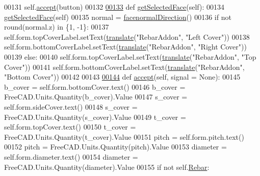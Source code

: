 \begin{DoxyCode}
00131             self.\hyperlink{classHelicalRebar_1_1__HelicalRebarTaskPanel_acdfb101876d4841ba277e2e884ebaf9d}{accept}(button)
00132 
\hypertarget{HelicalRebar_8py_source.tex_l00133}{}\hyperlink{classHelicalRebar_1_1__HelicalRebarTaskPanel_aea514ce88bde89c57ab88576e7a27230}{00133}     \textcolor{keyword}{def }\hyperlink{classHelicalRebar_1_1__HelicalRebarTaskPanel_aea514ce88bde89c57ab88576e7a27230}{getSelectedFace}(self):
00134         \hyperlink{classHelicalRebar_1_1__HelicalRebarTaskPanel_aea514ce88bde89c57ab88576e7a27230}{getSelectedFace}(self)
00135         normal = \hyperlink{namespaceRebarfunc_a3a8c123c290609baec3a547c20a561b9}{facenormalDirection}()
00136         \textcolor{keywordflow}{if} \textcolor{keywordflow}{not} round(normal.z) \textcolor{keywordflow}{in} \{1, -1\}:
00137             self.form.topCoverLabel.setText(\hyperlink{namespaceRebarfunc_a1467a55852e36c36c472e222855bb937}{translate}(\textcolor{stringliteral}{"RebarAddon"}, \textcolor{stringliteral}{"Left Cover"}))
00138             self.form.bottomCoverLabel.setText(\hyperlink{namespaceRebarfunc_a1467a55852e36c36c472e222855bb937}{translate}(\textcolor{stringliteral}{"RebarAddon"}, \textcolor{stringliteral}{"Right Cover"}))
00139         \textcolor{keywordflow}{else}:
00140             self.form.topCoverLabel.setText(\hyperlink{namespaceRebarfunc_a1467a55852e36c36c472e222855bb937}{translate}(\textcolor{stringliteral}{"RebarAddon"}, \textcolor{stringliteral}{"Top Cover"}))
00141             self.form.bottomCoverLabel.setText(\hyperlink{namespaceRebarfunc_a1467a55852e36c36c472e222855bb937}{translate}(\textcolor{stringliteral}{"RebarAddon"}, \textcolor{stringliteral}{"Bottom Cover"}))
00142 
00143 
\hypertarget{HelicalRebar_8py_source.tex_l00144}{}\hyperlink{classHelicalRebar_1_1__HelicalRebarTaskPanel_acdfb101876d4841ba277e2e884ebaf9d}{00144}     \textcolor{keyword}{def }\hyperlink{classHelicalRebar_1_1__HelicalRebarTaskPanel_acdfb101876d4841ba277e2e884ebaf9d}{accept}(self, signal = None):
00145         b\_cover = self.form.bottomCover.text()
00146         b\_cover = FreeCAD.Units.Quantity(b\_cover).Value
00147         s\_cover = self.form.sideCover.text()
00148         s\_cover = FreeCAD.Units.Quantity(s\_cover).Value
00149         t\_cover = self.form.topCover.text()
00150         t\_cover = FreeCAD.Units.Quantity(t\_cover).Value
00151         pitch = self.form.pitch.text()
00152         pitch = FreeCAD.Units.Quantity(pitch).Value
00153         diameter = self.form.diameter.text()
00154         diameter = FreeCAD.Units.Quantity(diameter).Value
00155         \textcolor{keywordflow}{if} \textcolor{keywordflow}{not} self.\hyperlink{classHelicalRebar_1_1__HelicalRebarTaskPanel_a18e1b46858c6d4ca5f6925d69ea15807}{Rebar}:

\end{DoxyCode}
